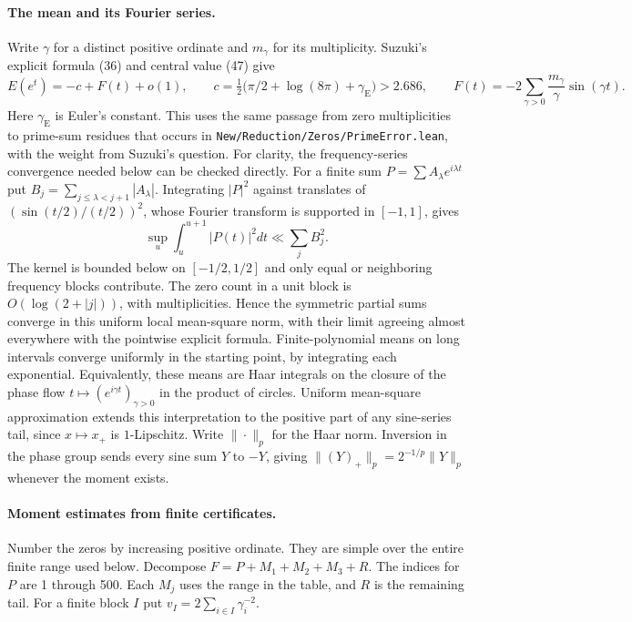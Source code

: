 \paragraph{The mean and its Fourier series.}
Write $\gamma$ for a distinct positive ordinate and $m_\gamma$ for its
multiplicity. Suzuki's explicit formula (36) and central value (47) give
\[
 E(e^t)=-c+F(t)+o(1),\qquad
 c=\tfrac12\bigl(\pi/2+\log(8\pi)+\gamma_{\mathrm E}\bigr)>2.686,
 \qquad F(t)=-2\sum_{\gamma>0}\frac{m_\gamma}{\gamma}\sin(\gamma t).
\]
Here $\gamma_{\mathrm E}$ is Euler's constant. This uses the same passage
from zero multiplicities to prime-sum residues that occurs in
\texttt{New/Reduction/Zeros/PrimeError.lean}, with the weight from Suzuki's
question. For clarity, the frequency-series convergence needed below can
be checked directly. For a finite sum $P=\sum A_\lambda e^{i\lambda t}$
put $B_j=\sum_{j\le\lambda<j+1}|A_\lambda|$. Integrating $|P|^2$ against
translates of $(\sin(t/2)/(t/2))^2$, whose Fourier transform is supported
in $[-1,1]$, gives
\[
 \sup_u\int_u^{u+1}|P(t)|^2dt\ll\sum_j B_j^2 .
\]
The kernel is bounded below on $[-1/2,1/2]$ and only equal or neighboring
frequency blocks contribute. The zero count in a unit block is
$O(\log(2+|j|))$, with multiplicities. Hence the symmetric partial sums
converge in this uniform local mean-square norm, with their limit agreeing
almost everywhere with the pointwise explicit formula. Finite-polynomial
means on long intervals converge uniformly in the starting point, by
integrating each exponential. Equivalently, these means are Haar
integrals on the closure of the phase flow
$t\mapsto(e^{i\gamma t})_{\gamma>0}$ in the product of circles. Uniform
mean-square approximation extends this interpretation to the positive
part of any sine-series tail, since $x\mapsto x_+$ is $1$-Lipschitz.
Write $\|\cdot\|_p$ for the Haar norm. Inversion in the phase group
sends every sine sum $Y$ to $-Y$, giving
$\|(Y)_+\|_p=2^{-1/p}\|Y\|_p$ whenever the moment exists.

\paragraph{Moment estimates from finite certificates.}
Number the zeros by increasing positive ordinate. They are simple over
the entire finite range used below. Decompose
$F=P+M_1+M_2+M_3+R$. The indices for $P$ are 1 through 500. Each $M_j$
uses the range in the table, and $R$ is the remaining tail. For a
finite block $I$ put $v_I=2\sum_{i\in I}\gamma_i^{-2}$.

